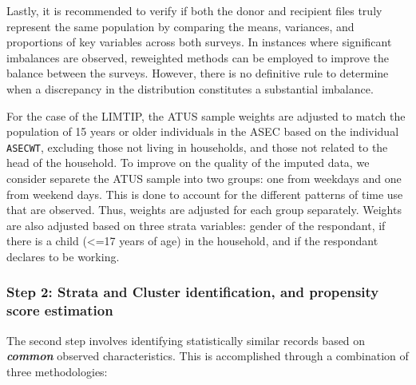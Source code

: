 \documentclass[
  11pt,
]{article}
\begin{document}
Lastly, it is recommended to verify if both the donor and recipient
files truly represent the same population by comparing the means,
variances, and proportions of key variables across both surveys. In
instances where significant imbalances are observed, reweighted methods
can be employed to improve the balance between the surveys. However,
there is no definitive rule to determine when a discrepancy in the
distribution constitutes a substantial imbalance.

For the case of the LIMTIP, the ATUS sample weights are adjusted to
match the population of 15 years or older individuals in the ASEC based
on the individual \texttt{ASECWT}, excluding those not living in
households, and those not related to the head of the household. To
improve on the quality of the imputed data, we consider separete the
ATUS sample into two groups: one from weekdays and one from weekend
days. This is done to account for the different patterns of time use
that are observed. Thus, weights are adjusted for each group separately.
Weights are also adjusted based on three strata variables: gender of the
respondant, if there is a child (\textless=17 years of age) in the
household, and if the respondant declares to be working.

\subsubsection{Step 2: Strata and Cluster identification, and propensity
score
estimation}\label{step-2-strata-and-cluster-identification-and-propensity-score-estimation}

The second step involves identifying statistically similar records based
on \textbf{\emph{common}} observed characteristics. This is accomplished
through a combination of three methodologies:
\end{document}
